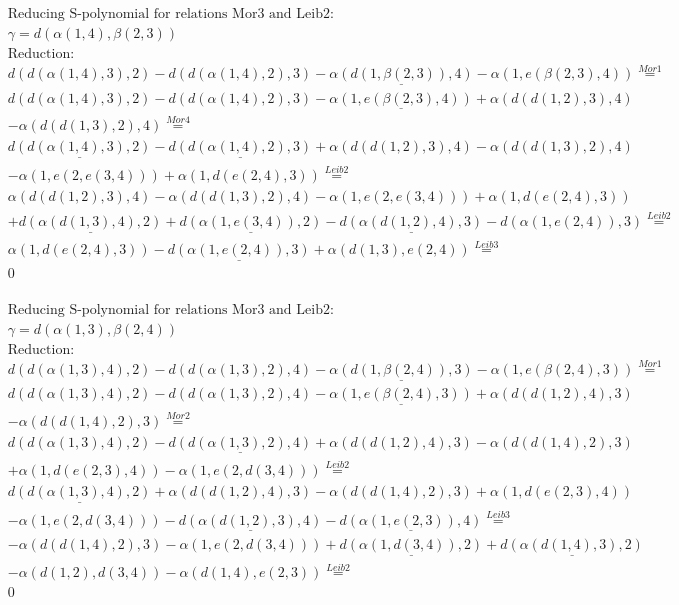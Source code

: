 \documentclass[11pt]{amsart}
\begin{document}
\begin{align*} 
& \text{Reducing S-polynomial for relations Mor3 and Leib2:} \\ 
& \gamma = d(\alpha(1,4),\beta(2,3)) \\ 
& \text{Reduction}: \\&d(d(\alpha(1,4),3),2) - d(d(\alpha(1,4),2),3) - \underline{\alpha(d(1,\beta(2,3)),4)} - \alpha(1,e(\beta(2,3),4)) \stackrel{ Mor1 }{=}  \\ 
&d(d(\alpha(1,4),3),2) - d(d(\alpha(1,4),2),3) - \underline{\alpha(1,e(\beta(2,3),4))} + \alpha(d(d(1,2),3),4)\\ 
 &  - \alpha(d(d(1,3),2),4) \stackrel{ Mor4 }{=}  \\ 
&\underline{d(d(\alpha(1,4),3),2)} - \underline{d(d(\alpha(1,4),2),3)} + \alpha(d(d(1,2),3),4) - \alpha(d(d(1,3),2),4)\\ 
 &  - \alpha(1,e(2,e(3,4))) + \alpha(1,d(e(2,4),3)) \stackrel{ Leib2 }{=}  \\ 
&\alpha(d(d(1,2),3),4) - \alpha(d(d(1,3),2),4) - \alpha(1,e(2,e(3,4))) + \alpha(1,d(e(2,4),3))\\ 
 &  + \underline{d(\alpha(d(1,3),4),2)} + \underline{d(\alpha(1,e(3,4)),2)} - \underline{d(\alpha(d(1,2),4),3)} - d(\alpha(1,e(2,4)),3) \stackrel{ Leib2 }{=}  \\ 
&\alpha(1,d(e(2,4),3)) - \underline{d(\alpha(1,e(2,4)),3)} + \alpha(d(1,3),e(2,4)) \stackrel{ Leib3 }{=}  \\ 
&0\\ 
\end{align*} 
 
\begin{align*} 
& \text{Reducing S-polynomial for relations Mor3 and Leib2:} \\ 
& \gamma = d(\alpha(1,3),\beta(2,4)) \\ 
& \text{Reduction}: \\&d(d(\alpha(1,3),4),2) - d(d(\alpha(1,3),2),4) - \underline{\alpha(d(1,\beta(2,4)),3)} - \alpha(1,e(\beta(2,4),3)) \stackrel{ Mor1 }{=}  \\ 
&d(d(\alpha(1,3),4),2) - d(d(\alpha(1,3),2),4) - \underline{\alpha(1,e(\beta(2,4),3))} + \alpha(d(d(1,2),4),3)\\ 
 &  - \alpha(d(d(1,4),2),3) \stackrel{ Mor2 }{=}  \\ 
&d(d(\alpha(1,3),4),2) - \underline{d(d(\alpha(1,3),2),4)} + \alpha(d(d(1,2),4),3) - \alpha(d(d(1,4),2),3)\\ 
 &  + \alpha(1,d(e(2,3),4)) - \alpha(1,e(2,d(3,4))) \stackrel{ Leib2 }{=}  \\ 
&\underline{d(d(\alpha(1,3),4),2)} + \alpha(d(d(1,2),4),3) - \alpha(d(d(1,4),2),3) + \alpha(1,d(e(2,3),4))\\ 
 &  - \alpha(1,e(2,d(3,4))) - \underline{d(\alpha(d(1,2),3),4)} - \underline{d(\alpha(1,e(2,3)),4)} \stackrel{ Leib3 }{=}  \\ 
& - \alpha(d(d(1,4),2),3) - \alpha(1,e(2,d(3,4))) + \underline{d(\alpha(1,d(3,4)),2)} + \underline{d(\alpha(d(1,4),3),2)}\\ 
 &  - \alpha(d(1,2),d(3,4)) - \alpha(d(1,4),e(2,3)) \stackrel{ Leib2 }{=}  \\ 
&0\\ 
\end{align*} 
 
\end{document}
